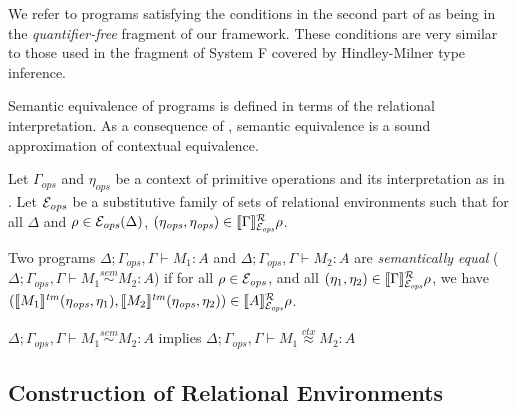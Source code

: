 We refer to programs satisfying the conditions in the second part of
 as being in the \emph{quantifier-free}
fragment of our framework. These conditions are very similar to those
used in the fragment of System F covered by Hindley-Milner type
inference.

Semantic equivalence of programs is defined in terms of the relational
interpretation. As a consequence of , semantic
equivalence is a sound approximation of contextual equivalence.
\begin{definition}\label{def:semantic-equality}
  Let $\Gamma_{\mathit{ops}}$ and $\eta_{\mathit{ops}}$ be a context
  of primitive operations and its interpretation as in
  . Let $\mathcal{E}_{\mathit{ops}}$ be a
  substitutive family of sets of relational environments such that for
  all $\Delta$ and $\rho \in \mathcal{E}_{\mathit{ops}}(\Delta)$,
  $(\eta_{\mathit{ops}}, \eta_{\mathit{ops}}) \in
  \llbracket \Gamma \rrbracket^{\mathcal{R}}_{\mathcal{E}_{\mathit{ops}}}{\rho}$.

  Two programs $\Delta; \Gamma_{\mathit{ops}}, \Gamma \vdash M_1 : A$
  and $\Delta; \Gamma_{\mathit{ops}}, \Gamma \vdash M_2 : A$ are
  \emph{semantically equal} ($\Delta; \Gamma_{\mathit{ops}}, \Gamma
  \vdash M_1 \stackrel{sem}\sim M_2 : A$) if for all $\rho \in
  \mathcal{E}_{\mathit{ops}}$, and all $(\eta_1,\eta_2) \in
  \llbracket \Gamma \rrbracket^{\mathcal{R}}_{\mathcal{E}_{\mathit{ops}}}{\rho}$, we have
  $(\llbracket M_1 \rrbracket^{\mathit{tm}}(\eta_{\mathit{ops}},
  \eta_1),\llbracket M_2 \rrbracket^{\mathit{tm}}(\eta_{\mathit{ops}}, \eta_2)) \in
  \llbracket A \rrbracket^{\mathcal{R}}_{\mathcal{E}_{\mathit{ops}}}{\rho}$.
\end{definition}

\begin{theorem}\label{thm:soundness}
  $\Delta; \Gamma_{\mathit{ops}}, \Gamma \vdash M_1 \stackrel{sem}\sim M_2 : A$ implies
  $\Delta; \Gamma_{\mathit{ops}}, \Gamma \vdash M_1 \stackrel{ctx}\approx M_2 : A$
\end{theorem}

\subsection{Construction of Relational Environments}
\label{sec:constr-rel-env}

\newcommand{\Gen}{\mathrm{Gen}}
\newcommand{\Free}{\mathrm{Free}}
\newcommand{\semSort}[1]{\llbracket #1 \rrbracket^{\mathcal{S}}}
\newcommand{\semIndexExp}[1]{\llbracket #1 \rrbracket^{\mathcal{I}}}

